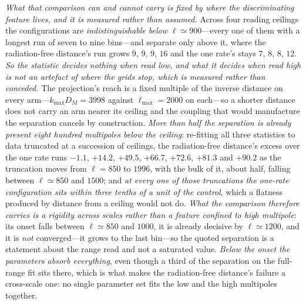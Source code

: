 \documentclass[11pt,a4paper]{article}
\theoremstyle{plain}
\theoremstyle{definition}
\theoremstyle{remark}
\begin{document}
\emph{What that comparison can and cannot carry is fixed by where the discriminating feature lives, and
it is measured rather than assumed.} Across four reading ceilings the configurations are
\emph{indistinguishable below $\ell\simeq900$}---every one of them with a longest run of seven to nine
bins---and separate only above it, where the radiation-free distance's run grows $9$, $9$, $9$, $16$
and the one rate's stays $7$, $8$, $8$, $12$. \emph{So the statistic decides nothing when read low, and what it decides when read high is not an
artefact of where the grids stop, which is measured rather than conceded.} The projection's reach is a
fixed multiple of the inverse distance on every arm---$k_{\max}D_M=3998$ against $\ell_{\max}=2000$ on
each---so a shorter distance does not carry an arm nearer its ceiling and the coupling that would
manufacture the separation cancels by construction. \emph{More than half the separation is already
present eight hundred multipoles below the ceiling}: re-fitting all three statistics to data truncated at
a succession of ceilings, the radiation-free distance's excess over the one rate runs $-1.1$,
$+14.2$, $+49.5$, $+66.7$, $+72.6$, $+81.3$ and $+90.2$ as the truncation moves from $\ell=850$ to
$1996$, with the bulk of it, about half, falling between $\ell\simeq850$ and $1500$; and \emph{at every
one of those truncations the one-rate configuration sits within three tenths of a unit of the control}, which a
flatness produced by distance from a ceiling would not do. \emph{What the comparison therefore carries is
a rigidity across scales rather than a feature confined to high multipole}: its onset falls between
$\ell\simeq850$ and $1000$, it is already decisive by $\ell\simeq1200$, and it is \emph{not} converged---it
grows to the last bin---so the quoted separation is a statement about the range read and not a saturated
value. \emph{Below the onset the parameters absorb everything}, even though a third of the separation on
the full-range fit sits there, which is what makes the radiation-free distance's failure a cross-scale one: no single parameter set
fits the low and the high multipoles together.
\end{document}
